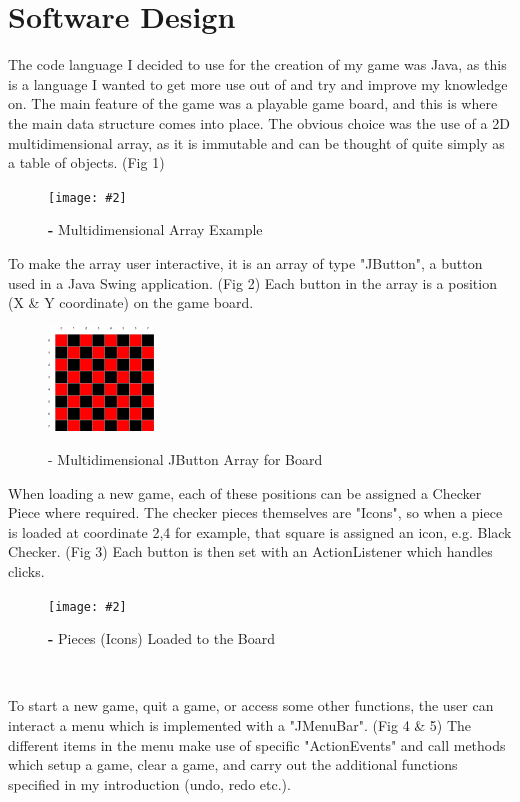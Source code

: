 \documentclass[10pt, a4paper]{article}
\newcommand{\figuremacro}[5]{
    \begin{figure}[#1]
        \centering
        \texttt{[image: \#2]}
        \caption{\textbf#4}
        \label{#3}
    \end{figure}
}
\begin{document}
\section{Software Design}
{
The code language I decided to use for the creation of my game was Java, as this is a language I wanted to get more use out of and try and improve my knowledge on.
\newline
\newline
The main feature of the game was a playable game board, and this is where the main data structure comes into place. The obvious choice was the use of a 2D multidimensional array, as it is immutable and can be thought of quite simply as a table of objects. (Fig 1)
\figuremacro{H}{Fig1}{}{ - Multidimensional Array Example}{0.8}
\newpage
To make the array user interactive, it is an array of type "JButton", a button used in a Java Swing application. (Fig 2) Each button in the array is a position (X \& Y coordinate) on the game board. 
\begin{figure} %
    \centering
    \includegraphics[width=0.25\textwidth]{Fig2}
\label{fig:}
\caption{ - Multidimensional JButton Array for Board}
\end{figure}
\newline
When loading a new game, each of these positions can be assigned a Checker Piece where required. The checker pieces themselves are "Icons", so when a piece is loaded at coordinate 2,4 for example, that square is assigned an icon, e.g. Black Checker. (Fig 3)
Each button is then set with an ActionListener which handles clicks.
\qquad
\figuremacro{H}{Fig3}{}{ - Pieces (Icons) Loaded to the Board}{0.6}
\qquad
\\
}
To start a new game, quit a game, or access some other functions, the user can interact a menu which is implemented with a "JMenuBar". (Fig 4 \& 5) The different items in the menu make use of specific "ActionEvents" and call methods which setup a game, clear a game, and carry out the additional functions specified in my introduction (undo, redo etc.).
\end{document}
